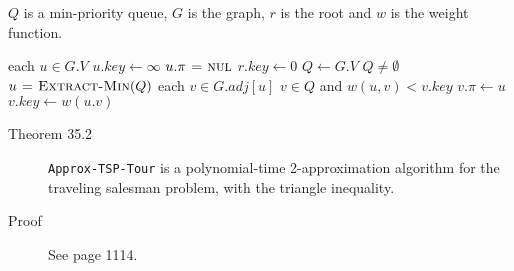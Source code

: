 $Q$ is a min-priority queue, $G$ is the graph, $r$ is the root and $w$ is the
weight function.
\begin{codebox}
\li \For each $u \in G.V$ \Do
\li   $u.key \gets \infty$
\li   $u.\pi \mathrel{\hspace{1pt}=\hspace{1pt}} \textnormal{\scshape nul}$ \End
\li $r.key \gets 0$
\li $Q \gets G.V$
\li \While $Q \neq \emptyset$ \Do
\li   $u \mathrel{\hspace{1pt}=\hspace{1pt}} \textnormal{\scshape Extract-Min}(Q)$
\li   \For each $v \in G.adj[u]$ \Do
\li     \If $v \in Q$ and $w(u,v) < v.key$ \Do
\li       $v.\pi \gets u$
\li       $v.key \gets w(u.v)$
\end{codebox}


\begin{description}
\item[Theorem 35.2] \texttt{Approx-TSP-Tour} is a polynomial-time
  2-approximation algorithm for the traveling salesman problem, with the
  triangle inequality.

\item[Proof] See page 1114.
\end{description}
